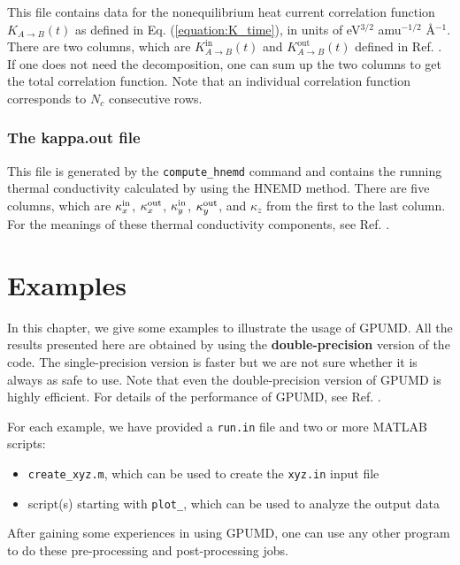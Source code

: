 \documentclass[12pt,a4paper]{report}
\begin{document}
This file contains data for the nonequilibrium heat current correlation function $K_{A \rightarrow B}(t)$ as defined in Eq. (\ref{equation:K_time}), in units of eV$^{3/2}$ amu$^{-1/2}$ \AA$^{-1}$. There are two columns, which are $K_{A \rightarrow B}^{\text{in}}(t)$ and $K_{A \rightarrow B}^{\text{out}}(t)$ defined in Ref. \cite{fan2017prb}. If one does not need the decomposition, one can sum up the two columns to get the total correlation function. Note that an individual correlation function corresponds to $N_c$ consecutive rows.


\subsection{The kappa.out file}

This file is generated by the \verb"compute_hnemd" command and contains the running thermal conductivity calculated by using the HNEMD method. There are five columns, which are $\kappa^{\rm in}_x$, $\kappa^{\rm out}_x$, $\kappa^{\rm in}_y$, $\kappa^{\rm out}_y$, and $\kappa_z$ from the first to the last column. For the meanings of these thermal conductivity components, see Ref. \cite{fan2018submitted,xu2018msmse,dong2018pccp}.

\chapter{Examples\label{chapter:examples}}

In this chapter, we give some examples to illustrate the usage of GPUMD. All the results presented here are obtained by using the \textbf{double-precision} version of the code. The single-precision version is faster but we are not sure whether it is always as safe to use.
Note that even the double-precision version of GPUMD is highly efficient. For details of the performance of GPUMD, see Ref. \cite{fan2017cpc}.

For each example, we have provided a \verb"run.in" file and two or more MATLAB scripts:
\begin{itemize}
\item \verb"create_xyz.m", which can be used to create the \verb"xyz.in" input file
\item script(s) starting with \verb"plot_", which can be used to analyze the output data
\end{itemize}
After gaining some experiences in using GPUMD, one can use any other program to do these pre-processing and post-processing jobs.
\end{document}
